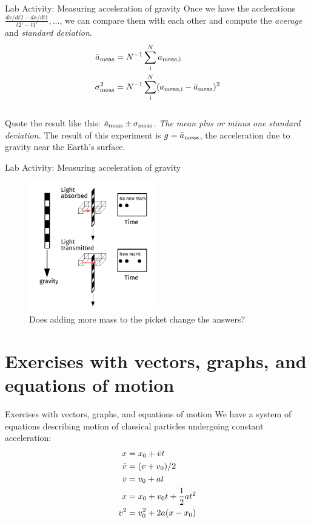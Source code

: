 \documentclass{beamer}
\begin{document}
\begin{frame}{Lab Activity: Measuring acceleration of gravity}
Once we have the acclerations $\frac{dx/dt2-dx/dt1}{t2'-t1'}, ...$, we can compare them with each other and compute the \textit{average} and \textit{standard deviation}.\\
\begin{align}
\bar{a}_{\rm meas} &= N^{-1} \sum_{\rm i}^N a_{\rm meas,i} \\
\sigma^2_{\rm meas} &= N^{-1} \sum_{\rm i}^N (a_{\rm meas,i}-\bar{a}_{\rm meas})^2
\end{align} \\
Quote the result like this: $\bar{a}_{\rm meas}\pm\sigma_{\rm meas}$.  \textit{The mean plus or minus one standard deviation.}  The result of this experiment is $g = \bar{a}_{\rm meas}$, the acceleration due to gravity near the Earth's surface.
\end{frame}

\begin{frame}{Lab Activity: Measuring acceleration of gravity}
\small
\begin{figure}
\centering
\includegraphics[width=0.5\textwidth]{figures/PicketG.pdf}
\caption{\label{fig:picket3} Does adding more mass to the picket change the answers?}
\end{figure}
\end{frame}

\section{Exercises with vectors, graphs, and equations of motion}

\begin{frame}{Exercises with vectors, graphs, and equations of motion}
We have a system of equations describing motion of classical particles undergoing constant acceleration:
\begin{align}
x &= x_{\rm 0} +\bar{v}t \\
\bar{v} &= (v+v_{\rm 0})/2 \\
v &= v_{\rm 0} + at \\
x &= x_{\rm 0} + v_{\rm 0} t + 	\frac{1}{2}at^2 \\
v^2 &= v_{\rm 0}^2 + 2a(x-x_{\rm 0})
\end{align}
\end{frame}
\end{document}
